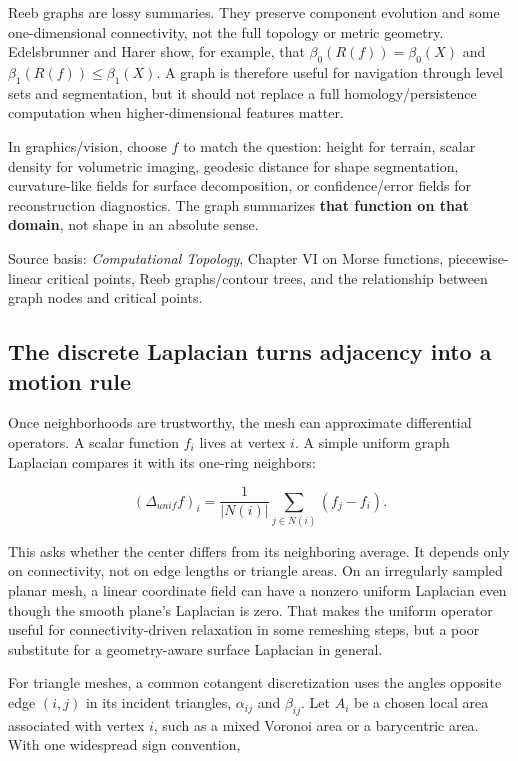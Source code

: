 Reeb graphs are lossy summaries. They preserve component evolution and some one-dimensional connectivity, not the full topology or metric geometry. Edelsbrunner and Harer show, for example, that \(\beta_0(R(f))=\beta_0(X)\) and \(\beta_1(R(f))\le\beta_1(X)\). A graph is therefore useful for navigation through level sets and segmentation, but it should not replace a full homology/persistence computation when higher-dimensional features matter.

In graphics/vision, choose \(f\) to match the question: height for terrain, scalar density for volumetric imaging, geodesic distance for shape segmentation, curvature-like fields for surface decomposition, or confidence/error fields for reconstruction diagnostics. The graph summarizes \textbf{that function on that domain}, not shape in an absolute sense.

Source basis: \emph{Computational Topology}, Chapter VI on Morse functions, piecewise-linear critical points, Reeb graphs/contour trees, and the relationship between graph nodes and critical points.

\subsection{The discrete Laplacian turns adjacency into a motion rule}\label{03-visual-computing-i-ch002-the-discrete-laplacian-turns-adjacency-into-a-motion-rule}

\hypertarget{03-visual-computing-i-ch002-the-discrete-laplacian-turns-adjacency-into-a-motion-rule}{}

Once neighborhoods are trustworthy, the mesh can approximate differential operators. A scalar function \(f_i\) lives at vertex \(i\). A simple uniform graph Laplacian compares it with its one-ring neighbors:

\[
(\Delta_{unif}f)_i=\frac{1}{|N(i)|}\sum_{j\in N(i)}(f_j-f_i).
\]

This asks whether the center differs from its neighboring average. It depends only on connectivity, not on edge lengths or triangle areas. On an irregularly sampled planar mesh, a linear coordinate field can have a nonzero uniform Laplacian even though the smooth plane's Laplacian is zero. That makes the uniform operator useful for connectivity-driven relaxation in some remeshing steps, but a poor substitute for a geometry-aware surface Laplacian in general.

For triangle meshes, a common cotangent discretization uses the angles opposite edge \((i,j)\) in its incident triangles, \(\alpha_{ij}\) and \(\beta_{ij}\). Let \(A_i\) be a chosen local area associated with vertex \(i\), such as a mixed Voronoi area or a barycentric area. With one widespread sign convention,

